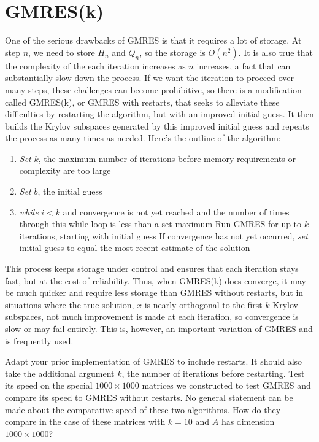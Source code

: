 \section*{GMRES(k)}
One of the serious drawbacks of GMRES is that it requires a lot of storage.
At step $n$, we need to store $H_n$ and $Q_n$, so the storage is $O(n^2)$.
It is also true that the complexity of the each iteration increases as $n$ increases, a fact that can substantially slow down the process.
If we want the iteration to proceed over many steps, these challenges can become prohibitive, so there is a modification called GMRES(k), or GMRES with restarts, that seeks to alleviate these difficulties by restarting the algorithm, but with an improved initial guess.
It then builds the Krylov subspaces generated by this improved initial guess and repeats the process as many times as needed.
Here's the outline of the algorithm:
\begin{enumerate}
\item \emph{Set} $k$, the maximum number of iterations before memory requirements or complexity are too large
\item \emph{Set} $b$, the initial guess
\item \emph{while} $i<k$ and convergence is not yet reached and the number of times through this while loop is less than a set maximum
\subitem Run GMRES for up to $k$ iterations, starting with initial guess
\subitem If convergence has not yet occurred, \emph{set} initial guess to equal the most recent estimate of the solution
\end{enumerate}

This process keeps storage under control and ensures that each iteration stays fast, but at the cost of reliability.
Thus, when GMRES(k) does converge, it may be much quicker and require less storage than GMRES without restarts, but in situations where the true solution, $x$ is nearly orthogonal to the first $k$ Krylov subspaces, not much improvement is made at each iteration, so convergence is slow or may fail entirely.
This is, however, an important variation of GMRES and is frequently used.

\begin{problem}
Adapt your prior implementation of GMRES to include restarts.
It should also take the additional argument $k$, the number of iterations before restarting.
Test its speed on the special $1000\times 1000$ matrices we constructed to test GMRES and compare its speed to GMRES without restarts.
No general statement can be made about the comparative speed of these two algorithms.
How do they compare in the case of these matrices with $k=10$ and $A$ has dimension $1000\times 1000$?
\label{prob:GMRES3}
\end{problem}

